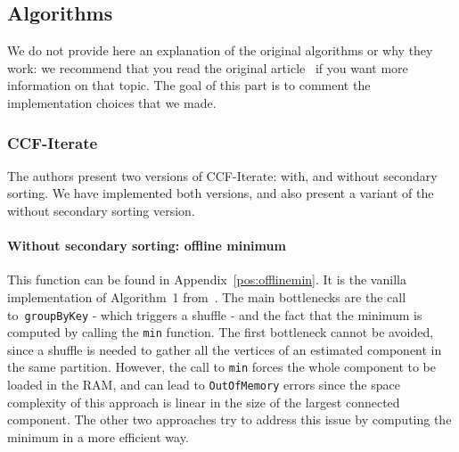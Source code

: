\documentclass[a4paper,12pt]{article}
\begin{document}
\subsection{Algorithms}
We do not provide here an explanation of the original algorithms or why they work: we recommend that you read the original article~\cite{kardes2014ccf} if you want more information on that topic. The goal of this part is to comment the implementation choices that we made.
\subsubsection{CCF-Iterate}
The authors present two versions of CCF-Iterate: with, and without secondary sorting. We have implemented both versions, and also present a variant of the without secondary sorting version.
\paragraph{Without secondary sorting: offline minimum}
This function can be found in Appendix~\ref{pos:offlinemin}. It is the vanilla implementation of Algorithm~1 from~\cite{kardes2014ccf}. The main bottlenecks are the call to~\verb|groupByKey| - which triggers a shuffle - and the fact that the minimum is computed by calling the \verb|min| function. The first bottleneck cannot be avoided, since a shuffle is needed to gather all the vertices of an estimated component in the same partition. However, the call to \verb|min| forces the whole component to be loaded in the RAM, and can lead to \verb|OutOfMemory| errors since the space complexity of this approach is linear in the size of the largest connected component. The other two approaches try to address this issue by computing the minimum in a more efficient way.
\end{document}
